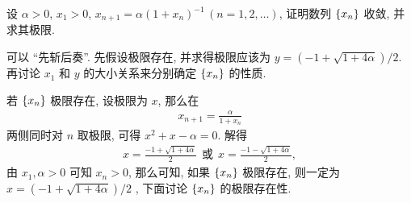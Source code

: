 \begin{exercise}[resume=exer]
\begin{answer}
        \end{answer}
        \item 设 $ \alpha > 0 $, $ x_{1} > 0 $, $ x_{n + 1} = \alpha(1 + x_{n})^{-1}\,(n = 1, 2, \dots) $, 证明数列 $ \qty{x_{n}} $ 收敛, 并求其极限.
        \begin{hint}
            可以 ``先斩后奏''. 先假设极限存在, 并求得极限应该为 $ y = (-1 + \sqrt{1 + 4\alpha})/2 $. 再讨论 $ x_{1} $ 和 $ y $ 的大小关系来分别确定 $ \qty{x_{n}} $ 的性质. 
        \end{hint}
        \begin{answer}
            若 $ \qty{x_{n}} $ 极限存在, 设极限为 $ x $, 那么在
            \begin{align*}
                x_{n + 1} = \frac{\alpha}{1 + x_{n}}
            \end{align*}
            两侧同时对 $ n $ 取极限, 可得 $ x^{2} + x - \alpha = 0 $. 解得
            \begin{align*}
                x = \frac{-1 + \sqrt{1 + 4\alpha}}{2} \ \ \text{或}\ \  x = \frac{-1 - \sqrt{1 + 4\alpha}}{2},
            \end{align*}
            由 $ x_{1}, \alpha > 0 $ 可知 $ x_{n} > 0 $, 那么可知, 如果 $ \qty{x_{n}} $ 极限存在, 则一定为 $ x = (-1 + \sqrt{1 + 4\alpha})/2 $ , 下面讨论 $ \qty{x_{n}} $ 的极限存在性. 
            

\end{answer}
\end{exercise}
